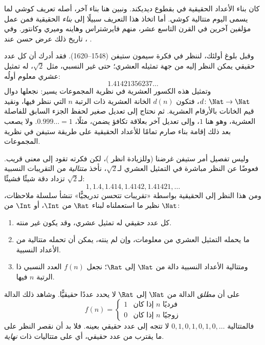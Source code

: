 \documentclass[../../../include/open-logic-section]{subfiles}
\begin{document}


كان بناء الأعداد الحقيقية في  بقطوع ديديكند. ونبين هنا بناء آخر، أصله تعريف كوشي لما يسمى اليوم متتالية كوشي. أما اتخاذ هذا التعريف سبيلًا إلى \emph{بناء} الحقيقية فمن عمل مؤلفين آخرين في القرن التاسع عشر، منهم فايرشتراس وهاينه وميري وكانتور. وفي تاريخ ذلك عرض حسن عند \citeauthor{OConnorRobertson:RN}، \citeyear{OConnorRobertson:RN}.

وقبل بلوغ أولئك، لننظر في فكرة سيمون ستيفن (1548--1620). فقد أدرك أن كل عدد حقيقي يمكن النظر إليه من جهة تمثيله العشري؛ حتى غير النسبي، مثل $\sqrt{2}$، له تمثيل عشري معلوم أولُه:
\[
	1.41421356237\ldots
\]
وتمثيل هذه الكسور العشرية في نظرية المجموعات يسير: نجعلها دوال $d \colon \Nat \to \Nat$، فتكون $d(n)$ الخانة العشرية ذات الرتبة $n$ التي ننظر فيها، ونقيد قيم الخانات بالأرقام العشرية. ثم نحتاج إلى تعديل صغير لحفظ الجزء السابق للفاصلة العشرية، وهو هنا $1$، وإلى تعديل آخر بعلاقة تكافؤ يضمن، مثلًا، $0.999\ldots = 1$. ولا يصعب بعد ذلك إقامة بناء صارم تمامًا للأعداد الحقيقية على طريقة ستيفن في نظرية المجموعات.

وليس تفصيل أمر ستيفن غرضنا (وللزيادة انظر \citealt{KatzKatz2012})، لكن فكرته تقود إلى معنى قريب. فعوضًا عن النظر مباشرة في التمثيل العشري لـ$\sqrt{2}$، نأخذ \emph{متتالية} من التقريبات النسبية لـ$\sqrt{2}$ تزداد دقة شيئًا فشيئًا:
\[
1, 1.4, 1.414, 1.4142, 1.41421,\ldots
\]
ومن هذا النظر إلى الحقيقية بواسطة «تقريبات تتحسن تدريجيًّا» تنشأ سلسلة ملاحظات، نظير ما استعملناه لبناء $\Rat$ من $\Int$، أو $\Int$ من $\Nat$:
\begin{enumerate}
\item كل عدد حقيقي له تمثيل عشري، وقد يكون غير منته.
\item ما يحمله التمثيل العشري من معلومات، وإن لم ينته، يمكن أن تحمله متتالية من الأعداد النسبية.
\item ومتتالية الأعداد النسبية دالة من $\Nat$ إلى $\Rat$؛ نجعل $f(n)$ العدد النسبي ذا الرتبة $n$ فيها.
\end{enumerate}
على أن \emph{مطلق} الدالة من $\Nat$ إلى $\Rat$ لا يحدد عددًا حقيقيًّا. وشاهد ذلك الدالة
\[
	f(n) =\begin{cases}
			1 & \text{إذا كان }n\text{ فرديًا}\\
			0 &\text{إذا كان }n\text{ زوجيًا}
		\end{cases}
\]
فالمتتالية $0,1,0,1,0,1,0,\ldots$ لا تتجه إلى عدد حقيقي بعينه. فلا بد أن نقصر النظر على ما يقترب من عدد حقيقي، أي على متتاليات ذات \emph{نهاية}.
\end{document}
